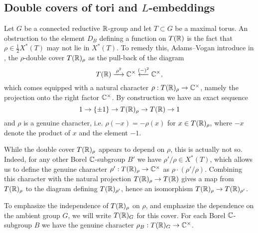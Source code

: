 \documentclass{article}
\theoremstyle{definition}
\numberwithin{equation}{section}
\renewcommand{\-}{\hyp{}}
\begin{document}
\subsection{Double covers of tori and $L$-embeddings} \label{sub:covtori}

Let $G$ be a connected reductive $\mathbb{R}$-group and let $T \subset G$ be a maximal torus. An obstruction to the element $D_B$ defining a function on $T(\mathbb{R})$ is the fact that $\rho \in \frac{1}{2}X^*(T)$ may not lie in $X^*(T)$. To remedy this, Adams--Vogan introduce in \cite{AV92}, \cite{AV16} the $\rho$-double cover $T(\mathbb{R})_\rho$ as the pull-back of the diagram
\[ T(\mathbb{R})\stackrel{\rho^2}{\longrightarrow} \mathbb{C}^\times \stackrel{(-)^2}{\longleftarrow} \mathbb{C}^\times, \]
which comes equipped with a natural character $\rho : T(\mathbb{R})_\rho \to \mathbb{C}^\times$, namely the projection onto the right factor $\mathbb{C}^\times$. By construction we have an exact sequence
\[ 1 \to \{\pm 1\} \to T(\mathbb{R})_\rho \to T(\mathbb{R}) \to 1 \]
and $\rho$ is a genuine character, i.e. $\rho(-x)=-\rho(x)$ for $x \in T(\mathbb{R})_\rho$, where $-x$ denote the product of $x$ and the element $-1$.

While the double cover $T(\mathbb{R})_\rho$ appears to depend on $\rho$, this is actually not so. Indeed, for any other Borel $\mathbb{C}$-subgroup $B'$ we have $\rho'/\rho \in X^*(T)$, which allows us to define the genuine character $\rho' : T(\mathbb{R})_\rho \to \mathbb{C}^\times$ as $\rho \cdot (\rho'/\rho)$. Combining this character with the natural projection $T(\mathbb{R})_\rho \to T(\mathbb{R})$ gives a map from $T(\mathbb{R})_\rho$ to the diagram defining $T(\mathbb{R})_{\rho'}$, hence an isomorphism $T(\mathbb{R})_\rho \to T(\mathbb{R})_{\rho'}$.

To emphasize the independence of $T(\mathbb{R})_\rho$ on $\rho$, and emphasize the dependence on the ambient group $G$, we will write $T(\mathbb{R})_G$ for this cover. For each Borel $\mathbb{C}$-subgroup $B$ we have the genuine character $\rho_B : T(\mathbb{R})_G \to \mathbb{C}^\times$.
\end{document}

